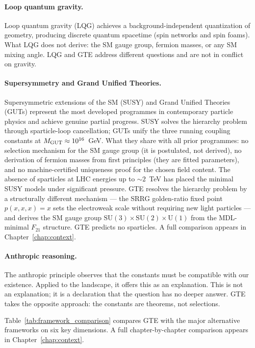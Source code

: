 \documentclass[11pt,openany]{book}
\theoremstyle{remark}
\begin{document}
\paragraph{Loop quantum gravity.}
Loop quantum gravity (LQG) achieves a background-independent quantization of geometry,
producing discrete quantum spacetime (spin networks and spin foams).
What LQG does not derive: the SM gauge group, fermion masses, or any SM mixing angle.
LQG and GTE address different questions and are not in conflict on gravity.

\paragraph{Supersymmetry and Grand Unified Theories.}
Supersymmetric extensions of the SM (SUSY) and Grand Unified Theories (GUTs) represent
the most developed programmes in contemporary particle physics and achieve genuine partial
progress.
SUSY solves the hierarchy problem through sparticle-loop cancellation;
GUTs unify the three running coupling constants at $M_{\rm GUT} \approx 10^{16}$~GeV.
What they share with all prior programmes: no selection mechanism for the SM gauge group
(it is postulated, not derived), no derivation of fermion masses from first principles
(they are fitted parameters), and no machine-certified uniqueness proof for the chosen
field content.
The absence of sparticles at LHC energies up to $\sim\!2$~TeV has placed the minimal SUSY
models under significant pressure.
GTE resolves the hierarchy problem by a structurally different mechanism --- the SRRG
golden-ratio fixed point $p(x,x,x)=x$ sets the electroweak scale without requiring
new light particles --- and derives the SM gauge group $\mathrm{SU}(3)\times\mathrm{SU}(2)\times\mathrm{U}(1)$
from the MDL-minimal $F_{21}$ structure.
GTE predicts no sparticles.
A full comparison appears in Chapter~\ref{chap:context}.

\paragraph{Anthropic reasoning.}
The anthropic principle observes that the constants must be compatible with our
existence.
Applied to the landscape, it offers this as an explanation.
This is not an explanation; it is a declaration that the question has no deeper answer.
GTE takes the opposite approach: the constants are theorems, not selections.

\medskip

Table~\ref{tab:framework_comparison} compares GTE with the major alternative frameworks
on six key dimensions.
A full chapter-by-chapter comparison appears in Chapter~\ref{chap:context}.
\end{document}
